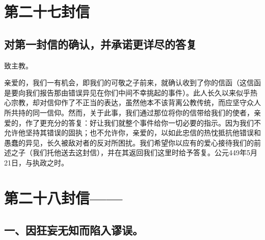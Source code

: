 
\section{第二十七封信}


\subsection{对第一封信的确认，并承诺更详尽的答复}

致主教。\par

亲爱的，我们一有机会，即我们的可敬之子前来，就确认收到了你的信函（这信函是要向我们报告那由错误异见在你们中间不幸挑起的事件）。此人长久以来似乎热心宗教，却对信仰作了不正当的表达，虽然他本不该背离公教传统，而应坚守众人所共持的同一信仰。然而，关于此事，我们通过那位将你的信带给我们的使者，亲爱的，作了更充分的答复：好让我们就整个事件给你一切必要的指示。因为我们不允许他坚持其错误的固执；也不允许你，亲爱的，以如此忠信的热忱抵抗他错误和愚蠢的异见，长久被敌对者的反对所困扰。我们希望你以应有的爱心接待我们的前述之子（我们托他送去这封信），并在其返回我们这里时给予答复。公元449年5月21日，与执政之时。\par



\section{第二十八封信——}

\par


\subsection{一、因狂妄无知而陷入谬误。}

